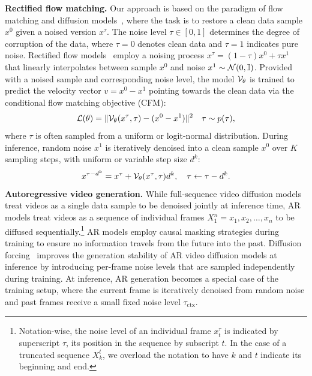 \textbf{Rectified flow matching.} Our approach is based on the paradigm of flow matching and diffusion models~\citep{lipman2022flow}, where the task is to restore a clean data sample $x^0$ given a noised version $x^\tau$.
The noise level $\tau \in [0, 1]$ determines the degree of corruption of the data, where $\tau=0$ denotes clean data and $\tau=1$ indicates pure noise.
Rectified flow models~\citep{lipman2022flow,albergo2023building} employ a noising process $x^\tau = (1-\tau)x^0 + \tau x^1$ that linearly interpolates between sample $x^0$ and noise $x^1 \sim \mathcal{N}(0,{\mathbb{I}})$. 
Provided with a noised sample and corresponding noise level, the model ${\mathcal{V}}_\theta$ is trained to predict the velocity vector $v = x^0 - x^1$ pointing towards the clean data via the conditional flow matching objective (CFM): 
\begin{equation}
    \mathcal{L}(\theta) = \lVert{\mathcal{V}}_\theta (x^\tau, \tau) - (x^0 - x^1)\rVert^2 \quad \tau \sim p(\tau),
\end{equation}
where $\tau$ is often sampled from a uniform or logit-normal distribution.
During inference, random noise $x^1$ is iteratively denoised into a clean sample $x^0$ over $K$ sampling steps, with uniform or variable step size $d^k$:
%
\begin{equation}
    x^{\tau - d^k} = x^\tau + {\mathcal{V}}_\theta (x^\tau, \tau) d^k, \quad \tau \leftarrow \tau - d^k.
\end{equation}
\textbf{Autoregressive video generation.} While full-sequence video diffusion models treat videos as a single data sample to be denoised jointly at inference time, AR models treat videos as a sequence of individual frames $X^{n}_1 = x_1,x_2,\dots,x_n$ to be diffused sequentially.\footnote{Notation-wise, the noise level of an individual frame $x^\tau_t$ is indicated by superscript $\tau$, its position in the sequence by subscript $t$.
In the case of a truncated sequence $X_k^{t}$, we overload the notation to have $k$ and $t$ indicate its beginning and end.} AR models employ causal masking strategies during training to ensure no information travels from the future into the past. Diffusion forcing~\citep{chen2024diffusion}
improves the generation stability of AR video diffusion models at inference by introducing per-frame noise levels that are sampled independently during training.
At inference, AR generation becomes a special case of the training setup, where the current frame is iteratively denoised from random noise and past frames receive a small fixed noise level $\tau_\text{ctx}$.

